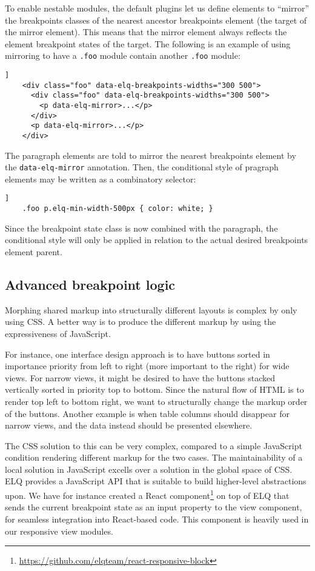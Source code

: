 \documentclass[sigplan,9pt]{acmart}
\newcommand{\elq}{ELQ}
\newcommand{\code}[1]{\texttt{#1}}
\begin{document}
  To enable nestable modules, the default plugins let us define elements to ``mirror'' the breakpoints classes of the nearest ancestor breakpoints element (the target of the mirror element).
  This means that the mirror element always reflects the element breakpoint states of the target.
  The following is an example of using mirroring to have a \code{.foo} module contain another \code{.foo} module:
  \begin{lstlisting}[gobble=4,caption={},captionpos=b,label={}]]
    <div class="foo" data-elq-breakpoints-widths="300 500">
      <div class="foo" data-elq-breakpoints-widths="300 500">
        <p data-elq-mirror>...</p>
      </div>
      <p data-elq-mirror>...</p>
    </div>
  \end{lstlisting}
  The paragraph elements are told to mirror the nearest breakpoints element by the \code{data-elq-mirror} annotation.
  Then, the conditional style of pragraph elements may be written as a combinatory selector:
  \begin{lstlisting}[gobble=4,caption={},captionpos=b,label={code:elq-mirror-example-css}]]
    .foo p.elq-min-width-500px { color: white; }
  \end{lstlisting}
  Since the breakpoint state class is now combined with the paragraph, the conditional style will only be applied in relation to the actual desired breakpoints element parent.

  \subsection{Advanced breakpoint logic}
    Morphing shared markup into structurally different layouts is complex by only using CSS.
    A better way is to produce the different markup by using the expressiveness of JavaScript.

    For instance, one interface design approach is to have buttons sorted in importance priority from left to right (more important to the right) for wide views.
    For narrow views, it might be desired to have the buttons stacked vertically sorted in priority top to bottom.
    Since the natural flow of HTML is to render top left to bottom right, we want to structurally change the markup order of the buttons.
    Another example is when table columns should disappear for narrow views, and the data instead should be presented elsewhere.

    The CSS solution to this can be very complex, compared to a simple JavaScript condition rendering different markup for the two cases.
    The maintainability of a local solution in JavaScript excells over a solution in the global space of CSS.
    \elq{} provides a JavaScript API that is suitable to build higher-level abstractions upon.
    We have for instance created a React component\footnote{\url{https://github.com/elqteam/react-responsive-block}} on top of \elq{} that sends the current breakpoint state as an input property to the view component, for seamless integration into React-based code. This component is heavily used in our responsive view modules.
\end{document}
